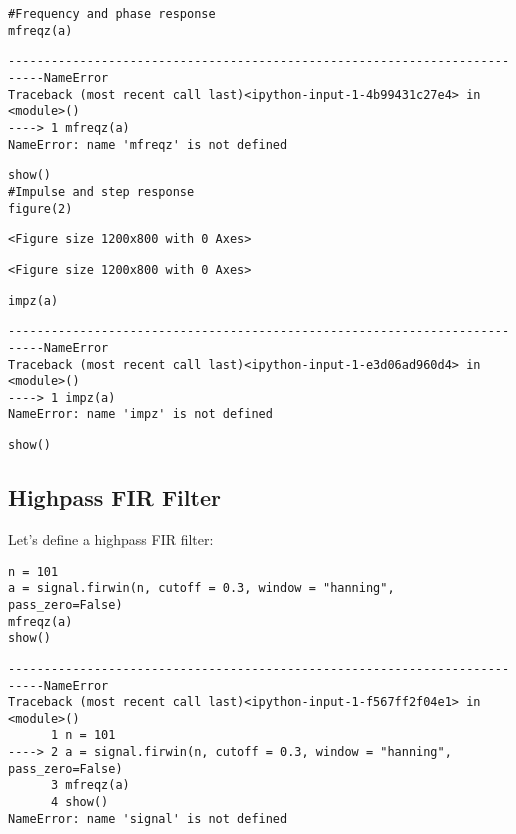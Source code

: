 \documentclass[a4paper,11pt,final]{article}
\begin{document}
\begin{verbatim}
#Frequency and phase response
mfreqz(a)
\end{verbatim}
\begin{verbatim}
---------------------------------------------------------------------------NameError
Traceback (most recent call last)<ipython-input-1-4b99431c27e4> in
<module>()
----> 1 mfreqz(a)
NameError: name 'mfreqz' is not defined
\end{verbatim}

\begin{verbatim}
show()
#Impulse and step response
figure(2)
\end{verbatim}
\begin{verbatim}
<Figure size 1200x800 with 0 Axes>
\end{verbatim}
\begin{verbatim}
<Figure size 1200x800 with 0 Axes>
\end{verbatim}

\begin{verbatim}
impz(a)
\end{verbatim}
\begin{verbatim}
---------------------------------------------------------------------------NameError
Traceback (most recent call last)<ipython-input-1-e3d06ad960d4> in
<module>()
----> 1 impz(a)
NameError: name 'impz' is not defined
\end{verbatim}

\begin{verbatim}
show()
\end{verbatim}


\subsection{Highpass FIR Filter}

Let's define a highpass FIR filter:


\begin{verbatim}
n = 101
a = signal.firwin(n, cutoff = 0.3, window = "hanning", pass_zero=False)
mfreqz(a)
show()
\end{verbatim}
\begin{verbatim}
---------------------------------------------------------------------------NameError
Traceback (most recent call last)<ipython-input-1-f567ff2f04e1> in
<module>()
      1 n = 101
----> 2 a = signal.firwin(n, cutoff = 0.3, window = "hanning",
pass_zero=False)
      3 mfreqz(a)
      4 show()
NameError: name 'signal' is not defined
\end{verbatim}
\end{document}

